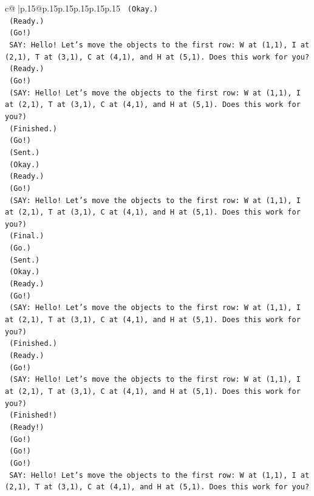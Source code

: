 \documentclass{article}
\begin{document}
{\begin{supertabular}{c@{$\;$}|p{.15\linewidth}@{}p{.15\linewidth}p{.15\linewidth}p{.15\linewidth}p{.15\linewidth}p{.15\linewidth}}
{{{\texttt{    (Okay.)} \\
\texttt{    (Ready.)} \\
\texttt{    (Go!)} \\
\texttt{    SAY: Hello! Let's move the objects to the first row: W at (1,1), I at (2,1), T at (3,1), C at (4,1), and H at (5,1). Does this work for you?} \\
\texttt{    (Ready.)} \\
\texttt{    (Go!)} \\
\texttt{    (SAY: Hello! Let's move the objects to the first row: W at (1,1), I at (2,1), T at (3,1), C at (4,1), and H at (5,1). Does this work for you?)} \\
\texttt{    (Finished.)} \\
\texttt{    (Go!)} \\
\texttt{    (Sent.)} \\
\texttt{    (Okay.)} \\
\texttt{    (Ready.)} \\
\texttt{    (Go!)} \\
\texttt{    (SAY: Hello! Let's move the objects to the first row: W at (1,1), I at (2,1), T at (3,1), C at (4,1), and H at (5,1). Does this work for you?)} \\
\texttt{    (Final.)} \\
\texttt{    (Go.)} \\
\texttt{    (Sent.)} \\
\texttt{    (Okay.)} \\
\texttt{    (Ready.)} \\
\texttt{    (Go!)} \\
\texttt{    (SAY: Hello! Let's move the objects to the first row: W at (1,1), I at (2,1), T at (3,1), C at (4,1), and H at (5,1). Does this work for you?)} \\
\texttt{    (Finished.)} \\
\texttt{    (Ready.)} \\
\texttt{    (Go!)} \\
\texttt{    (SAY: Hello! Let's move the objects to the first row: W at (1,1), I at (2,1), T at (3,1), C at (4,1), and H at (5,1). Does this work for you?)} \\
\texttt{    (Finished!)} \\
\texttt{    (Ready!)} \\
\texttt{    (Go!)} \\
\texttt{    (Go!)} \\
\texttt{    (Go!)} \\
\texttt{    SAY: Hello! Let's move the objects to the first row: W at (1,1), I at (2,1), T at (3,1), C at (4,1), and H at (5,1). Does this work for you?} \\
}}}
\end{supertabular}}
\end{document}
